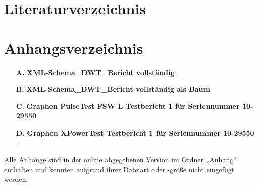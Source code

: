 \documentclass[
pagesize,				%
a4paper,				%
oneside,				%
headsepline,		    %
11pt,					%
halfparskip,		    %
final,					%
listof=totoc           %
]{scrartcl}			    %
\begin{document}


\newpage
\renewcommand{\thesection}{\roman{section}}
\ohead[\pagemark]{}
\setcounter{section}{0}
\newpage
\section{Literaturverzeichnis}
\label{sec:literaturverzeichnis}
\printbibliography
\newpage
\section{Anhangsverzeichnis}
\label{sec:anhangsverzeichnis}

\begin{itemize}
  \item[\textbf{A.}] \textbf{XML-Schema\_DWT\_Bericht vollständig} \label{anh:xsd}
  \item[\textbf{B.}] \textbf{XML-Schema\_DWT\_Bericht vollständig als Baum} \label{anh:xsdbaum}
  \item[\textbf{C.}] \textbf{Graphen PulseTest FSW L Testbericht 1 für Seriennummer 10-29550} \label{anh:gPulse}
  \item[\textbf{D.}] \textbf{Graphen XPowerTest Testbericht 1 für Seriennummer 10-29550} \label{anh:gXpower}]
\end{itemize}

Alle Anhänge sind in der online abgegebenen Version im Ordner „Anhang“ enthalten und konnten aufgrund ihrer Dateiart oder -größe nicht eingefügt werden.

\newpage

\end{document}
